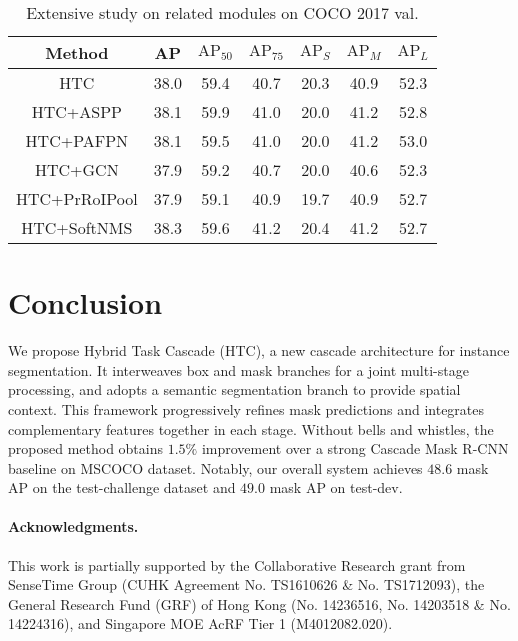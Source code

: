 \documentclass[10pt,twocolumn,letterpaper]{article}
\begin{document}
\begin{table}[htb]
	\centering
	\caption{Extensive study on related modules on COCO 2017 val.}
	\label{tab:extensive-study}
	\addtolength{\tabcolsep}{-2pt}
	\begin{tabular}{*{7}{c}}
		\toprule
		Method       & AP & $\text{AP}_{50}$ & $\text{AP}_{75}$ & $\text{AP}_{S}$ & $\text{AP}_{M}$ & $\text{AP}_{L}$ \\
		\midrule
		HTC          &38.0&       59.4       &       40.7       &      20.3       &      40.9       &      52.3       \\
		HTC+ASPP     &38.1&       59.9       &       41.0       &      20.0       &      41.2       &      52.8       \\
		HTC+PAFPN    &38.1&       59.5       &       41.0       &      20.0       &      41.2       &      53.0       \\
		HTC+GCN      &37.9&       59.2       &       40.7       &      20.0       &      40.6       &      52.3       \\
		HTC+PrRoIPool&37.9&       59.1       &       40.9       &      19.7       &      40.9       &      52.7       \\
		HTC+SoftNMS  &38.3&       59.6       &       41.2       &      20.4       &      41.2       &      52.7       \\
		\bottomrule
	\end{tabular}
	\vspace{-0.4cm}
\end{table} \section{Conclusion}

We propose Hybrid Task Cascade (HTC), a new cascade architecture for instance segmentation.
It interweaves box and mask branches for a joint multi-stage processing, and adopts a semantic segmentation branch to provide spatial context.
This framework progressively refines mask predictions and integrates complementary features together in each stage.
Without bells and whistles, the proposed method obtains
$1.5\%$ improvement over a strong Cascade Mask R-CNN baseline on MSCOCO dataset.
Notably, our overall system achieves $48.6$ mask AP on the
test-challenge dataset and $49.0$ mask AP on test-dev.

\vspace{-12pt}
\paragraph{Acknowledgments.}
This work is partially supported by the Collaborative Research grant from SenseTime Group (CUHK Agreement No. TS1610626 \& No. TS1712093), the General Research Fund (GRF) of Hong Kong (No. 14236516, No. 14203518 \& No. 14224316), and Singapore MOE AcRF Tier 1 (M4012082.020).
 
{\small


}
\end{document}
